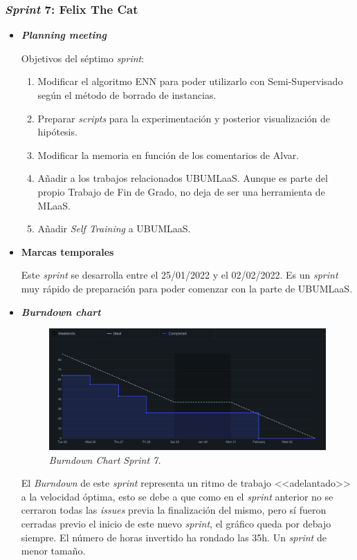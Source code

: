 \subsubsection{\textit{Sprint} 7: Felix The Cat}
\begin{itemize}
\item \textbf{\textit{Planning meeting}}

Objetivos del séptimo \textit{sprint}:
\begin{enumerate}
\item Modificar el algoritmo ENN para poder utilizarlo con Semi-Supervisado según el método de borrado de instancias.
\item Preparar \textit{scripts} para la experimentación y posterior visualización de hipótesis.
\item Modificar la memoria en función de los comentarios de Alvar.
\item Añadir a los trabajos relacionados UBUMLaaS. Aunque es parte del propio Trabajo de Fin de Grado, no deja de ser una herramienta de MLaaS.
\item Añadir \textit{Self Training} a UBUMLaaS.
\end{enumerate}
\item \textbf{Marcas temporales}

Este \textit{sprint} se desarrolla entre el 25/01/2022 y el 02/02/2022. Es un \textit{sprint} muy rápido de preparación para poder comenzar con la parte de UBUMLaaS.

\item \textbf{\textit{Burndown chart}}
\begin{figure}
\begin{center}
\includegraphics[width=\textwidth]{../img/anexos/sprints/BD-Sprint7}
\caption{\textit{Burndown Chart Sprint 7.}}\label{fig:BD-Sprint7}
\end{center}
\end{figure}

El \textit{Burndown} de este \textit{sprint} representa un ritmo de trabajo <<adelantado>> a la velocidad óptima, esto se debe a que como en el \textit{sprint} anterior no se cerraron todas las \textit{issues} previa la finalización del mismo, pero sí fueron cerradas previo el inicio de este nuevo \textit{sprint}, el gráfico queda por debajo siempre. El número de horas invertido ha rondado las 35h. Un \textit{sprint} de menor tamaño.


\end{itemize}
